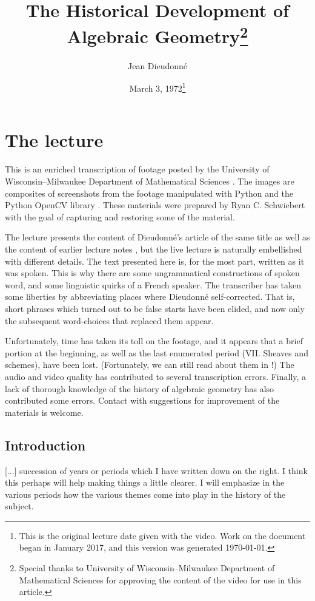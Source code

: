 \documentclass{article}
\begin{document}
\title{The Historical Development of Algebraic Geometry\thanks{Special thanks to University of Wisconsin–Milwaukee Department of Mathematical Sciences for approving the content of the video for use in this article.}}
\author{Jean Dieudonn\'e}
\date{March 3, 1972\thanks{This is the original lecture date given with the video. Work on the document began in January 2017, and this version was generated \today.}}
\maketitle

\section{The lecture}
This is an enriched transcription of footage posted by the University of Wisconsin–Milwaukee Department of Mathematical Sciences \cite{youtube}. The images are composites of screenshots from the footage manipulated with Python and the Python OpenCV library \cite{opencvgithub}. These materials were prepared by Ryan C. Schwiebert with the goal of capturing and restoring some of the material.

The lecture presents the content of Dieudonn\'e's article of the same title \cite{dieudonne1972historical} as well as the content of earlier lecture notes \cite{dieudonne1985history}, but the live lecture is naturally embellished with different details. The text presented here is, for the most part, written as it was spoken. This is why there are some ungrammatical constructions of spoken word, and some linguistic quirks of a French speaker. The transcriber has taken some liberties by abbreviating places where Dieudonn\'e self-corrected. That is, short phrases which turned out to be false starts have been elided, and now only the subsequent word-choices that replaced them appear.

Unfortunately, time has taken its toll on the footage, and it appears that a brief portion at the beginning, as well as the last enumerated period (VII. Sheaves and schemes), have been lost. (Fortunately, we can still read about them in \cite{dieudonne1972historical}!) The audio and video quality has contributed to several transcription errors. Finally, a lack of thorough knowledge of the history of algebraic geometry has also contributed some errors. Contact with suggestions for improvement of the materials is welcome.


\subsection{Introduction}
[...] succession of years or periods 
which I have written down on the right. 
I think this perhaps will help 
making things a little clearer. 
I will emphasize in the various periods 
how the various themes come into play 
in the history of the subject.
\end{document}
